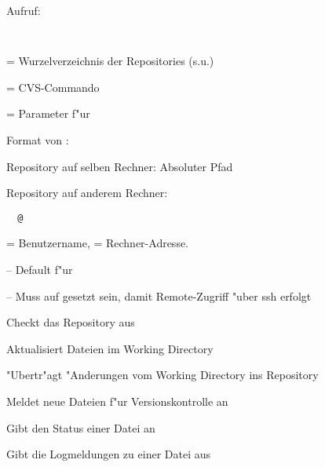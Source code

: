 \documentclass{article}
\begin{document}
\begin{mylist}

  \pitem Aufruf:

    \verb'  '

      = Wurzelverzeichnis der Repositories (s.u.)

          = CVS-Commando

       = Parameter f"ur 

  \pitem Format von :

    \begin{mylist}[\mylabelitemii]

       \pitem Repository auf selben Rechner: Absoluter Pfad

       \pitem Repository auf anderem Rechner:

           \verb'  '\verb'@'

          = Benutzername,  = Rechner-Adresse.

    \end{mylist}

\end{mylist}

\pagebreak


\begin{mylist}
  \pitem {} --  Default f"ur 

  \pitem{} -- Muss auf  gesetzt sein, damit Remote-Zugriff "uber ssh
                  erfolgt
\end{mylist}

\pagebreak



\begin{mylist}

  \pitem {}

       Checkt das Repository  aus

  \pitem {}

       Aktualisiert Dateien im Working Directory

  \pitem {}

       "Ubertr"agt "Anderungen vom Working Directory ins Repository

  \pitem {}

       Meldet neue Dateien f"ur Versionskontrolle an

  \pitem {}

       Gibt den Status einer Datei an


  \pitem {}

       Gibt die Logmeldungen zu einer Datei aus

\end{mylist}
\end{document}
